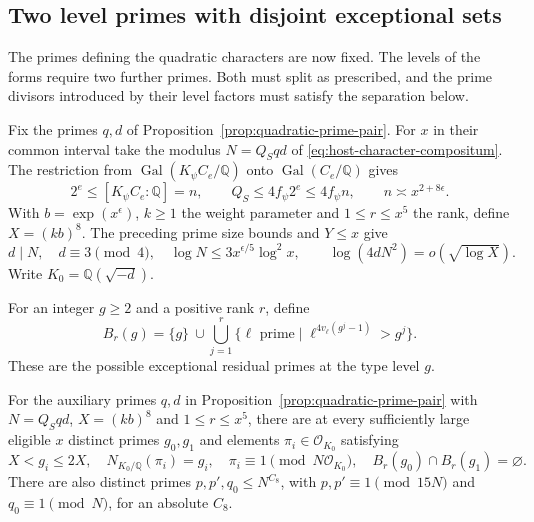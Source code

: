 \subsection{Two level primes with disjoint exceptional sets}
\hypertarget{source-level-primes}{}

The primes defining the quadratic characters are now fixed. The levels of the forms require two further primes. Both must split as prescribed, and the prime divisors introduced by their level factors must satisfy the separation below.

Fix the primes \(q,d\) of Proposition~\ref{prop:quadratic-prime-pair}.
For \(x\) in their common interval take the modulus
\(N=Q_Sqd\) of \eqref{eq:host-character-compositum}.
The restriction from \(\operatorname{Gal}(K_\psi C_e/\mathbb Q)\)
onto \(\operatorname{Gal}(C_e/\mathbb Q)\) gives
\[
   2^e\le [K_\psi C_e:\mathbb Q]=n,\qquad
   Q_S\le 4 f_\psi 2^e\le 4f_\psi n,\qquad n\asymp x^{2+8\epsilon}.
\] With
\(b=\exp(x^\epsilon)\), \(k\ge1\) the weight parameter and
\(1\le r\le x^5\) the rank, define \(X=(kb)^8\). The preceding
prime size bounds and \(Y\le x\) give
\[
 d\mid N,\quad d\equiv3\pmod4,\quad
 \log N\le3x^{\epsilon/5}\log^2 x,\qquad
 \log(4dN^2)=o(\sqrt{\log X}).
\]
Write \(K_0=\mathbb Q(\sqrt{-d})\). \begin{definition}\label{def:type-exceptional-primes}
For an integer \(g\ge2\) and a positive rank \(r\), define
\[
 B_r(g)=\{g\}\ \cup\!
 \bigcup_{j=1}^r\{\ell\text{ prime}\mid
                 \ell^{4v_\ell(g^j-1)}>g^j\}.
\]
These are the possible exceptional residual primes at the type
level \(g\).
\end{definition}

\begin{proposition}\label{prop:two-type-primes}
For the auxiliary primes \(q,d\) in Proposition~\ref{prop:quadratic-prime-pair}
with \(N=Q_Sqd\), \(X=(kb)^8\) and \(1\le r\le x^5\), there are
at every sufficiently large eligible \(x\) distinct
primes \(g_0,g_1\) and elements \(\pi_i\in\mathcal O_{K_0}\) satisfying
\[
 X<g_i\le2X,\quad N_{K_0/\mathbb Q}(\pi_i)=g_i,\quad \pi_i\equiv1\pmod{N\mathcal O_{K_0}},\quad B_r(g_0)\cap B_r(g_1)=\varnothing.
\] There are also distinct
primes \(p,p',q_0\le N^{C_8}\), with \(p,p'\equiv1\pmod{15N}\)
and \(q_0\equiv1\pmod N\), for an absolute \(C_8\).
\end{proposition}

